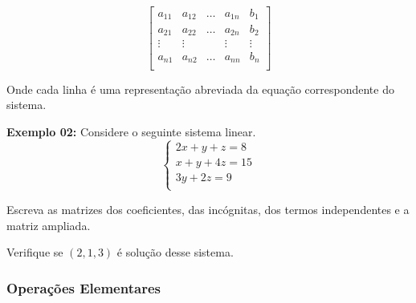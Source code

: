 \documentclass[oneside,a4paper,12pt]{article}
\begin{document}
$$
\left[
\begin{array}{ccccc}
a_{11} & a_{12} & \ldots & a_{1n} & b_1 \\
a_{21} & a_{22} & \ldots & a_{2n} & b_2 \\
\vdots & \vdots & & \vdots	&	\vdots \\
a_{n1} & a_{n2} & \ldots & a_{nn} & b_n\\
\end{array}
\right]
$$

Onde cada linha é uma representação abreviada da equação correspondente do sistema.

\textbf{Exemplo 02: }Considere o seguinte sistema linear.
$$
\left\{
\begin{array}{c}
	2x + y + z = 8 \\
	x + y + 4z = 15\\
	3y + 2z = 9 \\
\end{array}
\right.
$$

Escreva as matrizes dos coeficientes, das incógnitas, dos termos independentes e a matriz ampliada.

\vspace{200pt}

Verifique se $(2,1,3)$ é solução desse sistema.

\vspace{150pt}

\subsubsection{Operações Elementares}
\end{document}
